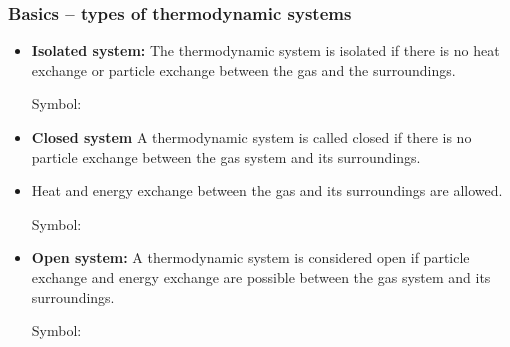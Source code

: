 \documentclass[t,aspectratio=169]{beamer}
\begin{document}
\begin{frame}
\frametitle{Basics – types of thermodynamic systems}
\begin{itemize}
\item \textbf{Isolated system:} The thermodynamic system is isolated if there is no heat exchange or particle exchange between the gas and the surroundings.

\smallskip

Symbol:

\begin{center}
\end{center}

\item \textbf{Closed system} A thermodynamic system is called closed if there is no particle exchange between the gas system and its surroundings.

\item Heat and energy exchange between the gas and its surroundings are allowed.

\smallskip

Symbol:

\begin{center}
\end{center}

\pagebreak
\item \textbf{Open system:} A thermodynamic system is considered open if particle exchange and energy exchange are possible between the gas system and its surroundings.

\smallskip

Symbol:

\begin{center}
\end{center}

\end{itemize}

\end{frame}
\end{document}
